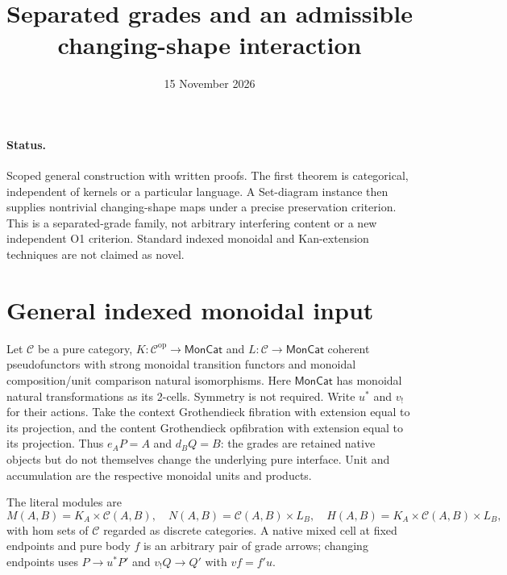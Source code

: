 \documentclass[11pt]{article}
\title{Separated grades and an admissible changing-shape interaction}
\date{15 November 2026}
\begin{document}
\maketitle
\paragraph{Status.} Scoped general construction with written proofs. The first theorem is categorical, independent of kernels or a particular language. A Set-diagram instance then supplies nontrivial changing-shape maps under a precise preservation criterion. This is a separated-grade family, not arbitrary interfering content or a new independent O1 criterion. Standard indexed monoidal and Kan-extension techniques are not claimed as novel.

\section{General indexed monoidal input}
Let $\mathcal C$ be a pure category, $K:\mathcal C^{\mathrm{op}}\to\mathsf{MonCat}$ and $L:\mathcal C\to\mathsf{MonCat}$ coherent pseudofunctors with strong monoidal transition functors and monoidal composition/unit comparison natural isomorphisms. Here $\mathsf{MonCat}$ has monoidal natural transformations as its 2-cells. Symmetry is not required. Write $u^*$ and $v_!$ for their actions. Take the context Grothendieck fibration with extension equal to its projection, and the content Grothendieck opfibration with extension equal to its projection. Thus $e_AP=A$ and $d_BQ=B$: the grades are retained native objects but do not themselves change the underlying pure interface. Unit and accumulation are the respective monoidal units and products.

The literal modules are
\[
 M(A,B)=K_A\times\mathcal C(A,B),\quad N(A,B)=\mathcal C(A,B)\times L_B,
 \quad H(A,B)=K_A\times\mathcal C(A,B)\times L_B,
\]
with hom sets of $\mathcal C$ regarded as discrete categories. A native mixed cell at fixed endpoints and pure body $f$ is an arbitrary pair of grade arrows; changing endpoints uses $P\to u^*P'$ and $v_!Q\to Q'$ with $vf=f'u$.
\end{document}
